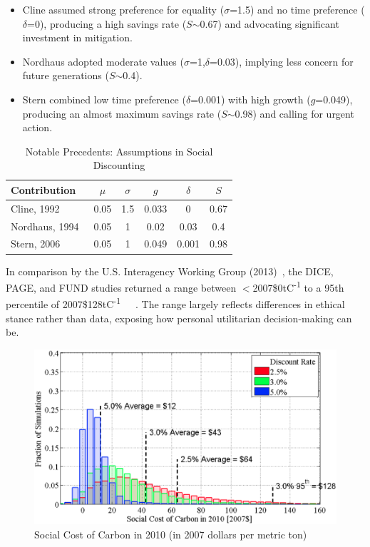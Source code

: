 \begin{itemize}
	\item Cline assumed strong preference for equality ($\sigma$=1.5) and no time preference ($\delta$=0), producing a high savings rate ($S$$\sim$0.67) and advocating significant investment in mitigation.
	\item Nordhaus adopted moderate values ($\sigma$=1,$\delta$=0.03), implying less concern for future generations ($S$$\sim$0.4).
	\item Stern combined low time preference ($\delta$=0.001) with high growth ($g$=0.049), producing an almost maximum savings rate ($S$$\sim$0.98) and calling for urgent action.
\end{itemize}

\begin{table}[H]
\caption{Notable Precedents: Assumptions in Social Discounting}
\begin{center}
\begin{tabular}{| l | c | c | c | c | c |}
\hline
Contribution&$\mu$&$\sigma$&$g$&$\delta$&$S$\\
\hline
Cline, 1992~\cite{wc1}&0.05&1.5&0.033&0&0.67 \\
Nordhaus, 1994~\cite{wn1}&0.05&1&0.02&0.03&0.4 \\
Stern, 2006~\cite{ns1}&0.05&1&0.049&0.001&0.98 \\
\hline
\end{tabular}
\end{center}
\label{Social contributions table}
\end{table}

In comparison by the U.S. Interagency Working Group (2013)~\cite{iwg1}, the DICE, PAGE, and FUND studies returned a range between $<$2007\$0tC\textsuperscript{-1} to a 95th percentile of 2007\$128tC\textsuperscript{-1}~\cite{wn1}~\cite{ch1}~\cite{rsjt1}.
The range largely reflects differences in ethical stance rather than data, exposing how personal utilitarian decision-making can be.\\

\begin{figure}[H]
	\centering
	\includegraphics[width=1\textwidth]{scc}
	\caption{Social Cost of Carbon in 2010 (in 2007 dollars per metric ton)}
	\label{USA SCC figure}
\end{figure}

